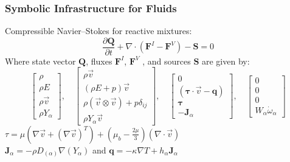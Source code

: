   \begin{frame}\frametitle{Symbolic Infrastructure for Fluids}
  \begin{center}
  Compressible Navier--Stokes for reactive mixtures:
  \begin{equation*}
    \frac{\partial\mathbf{Q}}{\partial{t}} + \nabla \cdot (\mathbf{F}^I - \mathbf{F}^V) - \mathbf{S} = 0
  \end{equation*}
    Where state vector $\mathbf{Q}$, fluxes $\mathbf{F}^I$, $\mathbf{F}^V$ , and sources $\mathbf{S}$ are given by:
 \begin{equation*}
      \begin{bmatrix}
        \rho\\\rho{E}\\\rho\vec{v}\\\rho{Y}_\alpha\end{bmatrix},\quad
      \begin{bmatrix} \rho\vec{v}\\(\rho{E} +
        p)\vec{v}\\\rho(\vec{v} \otimes \vec{v}) +
        p\delta_{ij}\\\rho{Y}_\alpha\vec{v}\end{bmatrix}, \quad
       \begin{bmatrix} 0\\(\mathbf{\tau} \cdot \vec{v} - \mathbf{q})\\\mathbf{\tau}\\-\mathbf{J}_\alpha\end{bmatrix},\quad
       \begin{bmatrix} 0\\0\\0\\W_\alpha\dot{\omega}_\alpha\end{bmatrix}
 \end{equation*}
 $\tau = \mu\left(\nabla\vec{v} + (\nabla\vec{v})^T\right) + \left(\mu_b - \frac{2\mu}{3}\right)\left(\nabla \cdot \vec{v}\right)$\\
\vspace{5pt}
$\mathbf{J}_\alpha = -\rho D_{(\alpha)} \nabla(Y_\alpha)$ \quad and \quad $\mathbf{q} = -\kappa\nabla{T} + h_\alpha\mathbf{J}_\alpha$\\
\vspace{10pt}

\end{center}
\end{frame}
